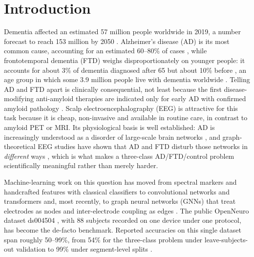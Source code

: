 \section{Introduction}\label{sec:intro}

Dementia affected an estimated 57 million people worldwide in 2019, a number forecast to reach 153
million by 2050 \cite{E1}. Alzheimer's disease (AD) is its most common cause, accounting for an
estimated 60--80\% of cases \cite{E2}, while frontotemporal dementia (FTD) weighs disproportionately on
younger people: it accounts for about 3\% of dementia diagnosed after 65 but about 10\% before
\cite{E4}, an age group in which some 3.9 million people live with dementia worldwide \cite{E3}.
Telling AD and FTD apart is clinically consequential, not least because the first disease-modifying
anti-amyloid therapies are indicated only for early AD with confirmed amyloid pathology \cite{E5}.
Scalp electroencephalography (EEG) is attractive for this task because it is cheap, non-invasive and
available in routine care, in contrast to amyloid PET or MRI. Its physiological basis is well
established: AD is increasingly understood as a disorder of large-scale brain networks
\cite{F12}, and graph-theoretical EEG studies have shown that AD and FTD disturb those networks in
\emph{different} ways \cite{F9}, which is what makes a three-class AD/FTD/control problem
scientifically meaningful rather than merely harder.

Machine-learning work on this question has moved from spectral markers and handcrafted features with
classical classifiers \cite{F10} to convolutional networks and transformers \cite{F2,R14} and,
most recently, to graph neural networks (GNNs) that treat electrodes as nodes and inter-electrode
coupling as edges \cite{F5,F3,F4,F6,R9,R10,R12}. The public OpenNeuro dataset ds004504
\cite{F1,ds004504}, with 88 subjects recorded on one device under one protocol, has become the
de-facto benchmark. Reported accuracies on this single dataset span roughly 50--99\%, from 54\% for the
three-class problem under leave-subjects-out validation \cite{P_stefanou} to 99\% under segment-level splits
\cite{R2}.

